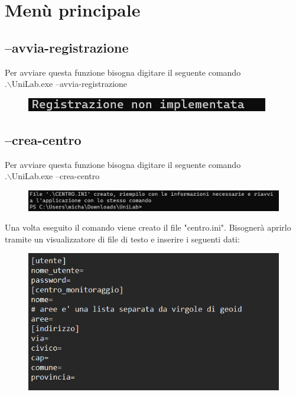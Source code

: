\documentclass[12pt]{scrreprt}
\begin{document}
	
		
	\section{Menù principale}
	
		\subsection{--avvia-registrazione}
		
		Per avviare questa funzione bisogna digitare il seguente comando
		\\.$\backslash$UniLab.exe --avvia-registrazione\\
		\begin{figure}[H]
			\centering
			\includegraphics[width=0.5\linewidth]{Screen/registrazione}
			\caption[Schermata principale]{}
			\label{fig:registrazione}
		\end{figure}
				
		
		\subsection{--crea-centro}
		Per avviare questa funzione bisogna digitare il seguente comando
		\\.$\backslash$UniLab.exe --crea-centro\\
		
		\begin{figure}[H]
			\centering
			\includegraphics[width=1\linewidth]{Screen/creacentrocom}
			\caption[Schermata principale]{}
			\label{fig:creacentrocom}
		\end{figure}
		
		Una volta eseguito il comando viene creato il file "centro.ini". Bisognerà aprirlo tramite un visualizzatore di file di testo e inserire i seguenti dati:
		
		\begin{figure}[H]
			\centering
			\includegraphics[width=0.8\linewidth]{Screen/creacentroini}
			\caption{}
			\label{fig:creacentroini}
		\end{figure}
		
\end{document}
